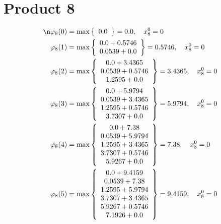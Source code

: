 \documentclass{article}
\begin{document}
\section{Product 8}
\begin{align*}
\n  
  
\varphi_{8}(0) &= \max \left\{ \begin{array}{c}
0.0
\end{array} \right\}=0.0,\quad x_{8}^0=0\\
  
  
  
  
\varphi_{8}(1) &= \max \left\{ \begin{array}{c}
0.0 + 0.5746 \\
 0.0539 + 0.0
\end{array} \right\}=0.5746,\quad x_{8}^0=0\\
  
  
  
  
\varphi_{8}(2) &= \max \left\{ \begin{array}{c}
0.0 + 3.4365 \\
 0.0539 + 0.5746 \\
 1.2595 + 0.0
\end{array} \right\}=3.4365,\quad x_{8}^0=0\\
  
  
  
  
\varphi_{8}(3) &= \max \left\{ \begin{array}{c}
0.0 + 5.9794 \\
 0.0539 + 3.4365 \\
 1.2595 + 0.5746 \\
 3.7307 + 0.0
\end{array} \right\}=5.9794,\quad x_{8}^0=0\\
  
  
  
  
\varphi_{8}(4) &= \max \left\{ \begin{array}{c}
0.0 + 7.38 \\
 0.0539 + 5.9794 \\
 1.2595 + 3.4365 \\
 3.7307 + 0.5746 \\
 5.9267 + 0.0
\end{array} \right\}=7.38,\quad x_{8}^0=0\\
  
  
  
  
\varphi_{8}(5) &= \max \left\{ \begin{array}{c}
0.0 + 9.4159 \\
 0.0539 + 7.38 \\
 1.2595 + 5.9794 \\
 3.7307 + 3.4365 \\
 5.9267 + 0.5746 \\
 7.1926 + 0.0
\end{array} \right\}=9.4159,\quad x_{8}^0=0\\
  

\end{align*}
\end{document}
